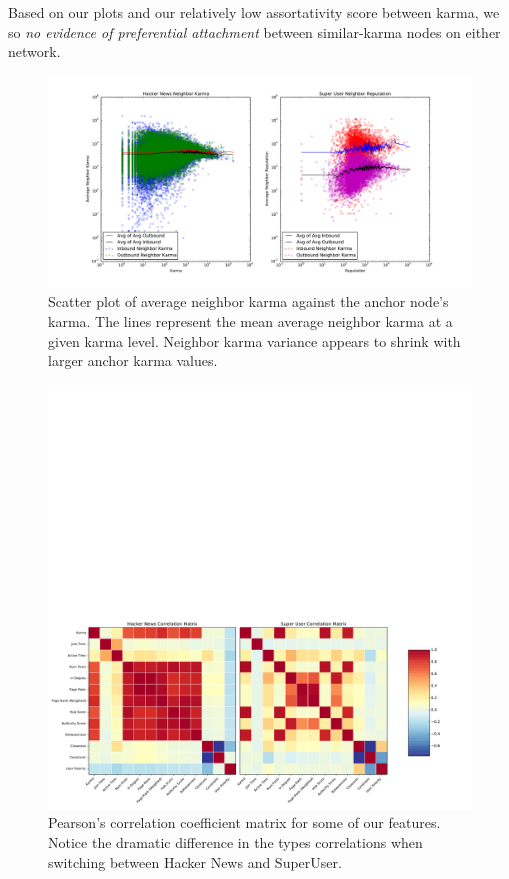 \documentclass[11pt]{article}
\begin{document}
Based on our plots and our relatively low assortativity score between karma, we
so \textit{no evidence of preferential attachment} between similar-karma nodes
on either network.


\begin{figure}[t]
\centering
\includegraphics[width=\linewidth]{karma_cliques}
\caption{Scatter plot of average neighbor karma against the anchor node's karma. 
The lines represent the mean average neighbor karma at a given karma level.
Neighbor karma variance appears to shrink with larger anchor karma values.}
\label{fig:karma_cliques}
\end{figure}

\begin{figure}[t]
\centering
\includegraphics[width=0.9\linewidth]{correlation}
\caption{Pearson's correlation coefficient matrix for some of our features.
Notice the dramatic difference in the types correlations when switching
between Hacker News and SuperUser.}
\label{fig:correlation}
\end{figure}
\end{document}

